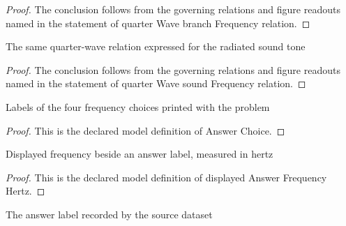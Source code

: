 \begin{proof}
  The conclusion follows from the governing relations and figure readouts named in the statement of quarter Wave branch Frequency relation.
\end{proof}
\begin{lemma}
  \label{lem:physics:phyx-mini-0213:phyxminiproblems-problemphyxmini0213-quarterwave-soundfrequency-relation}
  The same quarter-wave relation expressed for the radiated sound tone
\end{lemma}
\begin{proof}
  The conclusion follows from the governing relations and figure readouts named in the statement of quarter Wave sound Frequency relation.
\end{proof}
\begin{definition}
  \label{def:physics:phyx-mini-0213:phyxminiproblems-problemphyxmini0213-answerchoice}
  Labels of the four frequency choices printed with the problem
\end{definition}
\begin{proof}
  This is the declared model definition of Answer Choice.
\end{proof}
\begin{definition}
  \label{def:physics:phyx-mini-0213:phyxminiproblems-problemphyxmini0213-displayedanswerfrequencyhertz}
  Displayed frequency beside an answer label, measured in hertz
\end{definition}
\begin{proof}
  This is the declared model definition of displayed Answer Frequency Hertz.
\end{proof}
\begin{definition}
  \label{def:physics:phyx-mini-0213:phyxminiproblems-problemphyxmini0213-recordeddatasetanswer}
  The answer label recorded by the source dataset
\end{definition}

